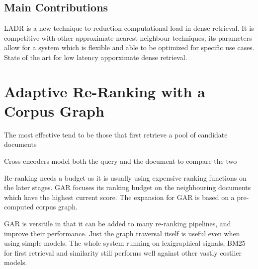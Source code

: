 \documentclass[sigconf,authorversion,nonacm]{acmart}
\begin{document}
\subsection{Main Contributions}

LADR is a new technique to reduction computational load in dense retrieval. It is competitive with
other approximate nearest neighbour techniques, its parameters allow for a system which is flexible
and able to be optimized for specific use cases. State of the art for low latency apporximate dense
retrieval.




\section{Adaptive Re-Ranking with a Corpus Graph}

The most effective tend to be those that first retrieve a pool of candidate documents

Cross encoders model both the query and the document to compare the two

Re-ranking needs a budget as it is usually using expensive ranking functions on the later stages.
GAR focuses its ranking budget on the neighbouring documents which have the highest current score.
The expansion for GAR is based on a pre-computed corpus graph.

GAR is versitile in that it can be added to many re-ranking pipelines, and improve their
performance. Just the graph traversal itself is useful even when using simple models. The whole
system running on lexigraphical signals, BM25 for first retrieval and similarity still performs
well against other vastly costlier models.
\end{document}
